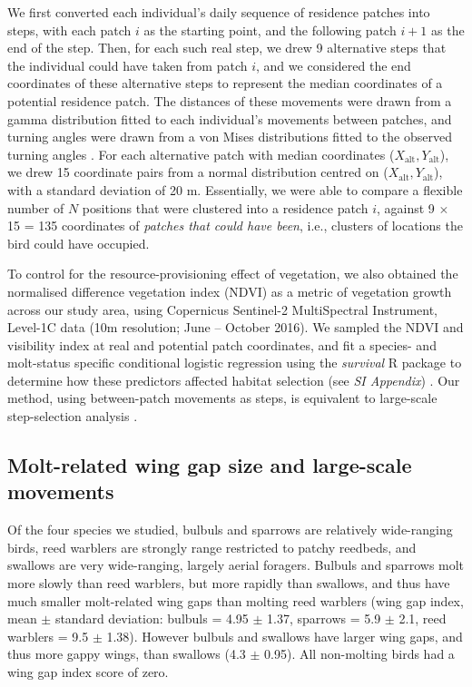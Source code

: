 \begin{refsection}
We first converted each individual's daily sequence of residence patches into steps, with each patch $i$ as the starting point, and the following patch $i+1$ as the end of the step.
Then, for each such real step, we drew 9 alternative steps that the individual could have taken from patch $i$, and we considered the end coordinates of these alternative steps to represent the median coordinates of a potential residence patch.
The distances of these movements were drawn from a gamma distribution fitted to each individual's movements between patches, and turning angles were drawn from a von Mises distributions fitted to the observed turning angles \citep{signer2019}.
For each alternative patch with median coordinates ($X_\text{alt}, Y_\text{alt}$), we drew 15 coordinate pairs from a normal distribution centred on ($X_\text{alt}, Y_\text{alt}$), with a standard deviation of 20 m.
Essentially, we were able to compare a flexible number of $N$ positions that were clustered into a residence patch $i$, against 9 $ \times$ 15 = 135 coordinates of \textit{patches that could have been}, i.e., clusters of locations the bird could have occupied.

To control for the resource-provisioning effect of vegetation, we also obtained the normalised difference vegetation index (NDVI) as a metric of vegetation growth \citep{pettorelli2011} across our study area, using Copernicus Sentinel-2 MultiSpectral Instrument, Level-1C data (10m resolution; June -- October 2016).
We sampled the NDVI and visibility index at real and potential patch coordinates, and fit a species- and molt-status specific conditional logistic regression using the \textit{survival} R package to determine how these predictors affected habitat selection (see \textit{SI Appendix}) \cite{signer2019,fieberg2021}.
Our method, using between-patch movements as steps, is equivalent to large-scale step-selection analysis \citep{fieberg2021}.

\subsection*{Molt-related wing gap size and large-scale movements}

Of the four species we studied, bulbuls and sparrows are relatively wide-ranging birds, reed warblers are strongly range restricted to patchy reedbeds, and swallows are very wide-ranging, largely aerial foragers.
Bulbuls and sparrows molt more slowly than reed warblers, but more rapidly than swallows, and thus have much smaller molt-related wing gaps than molting reed warblers {(wing gap index, mean $\pm$ standard deviation: bulbuls = 4.95 $\pm$ 1.37, sparrows = 5.9 $\pm$ 2.1, reed warblers = 9.5 $\pm$ 1.38)}.
However bulbuls and swallows have larger wing gaps, and thus more gappy wings, than swallows (4.3 $\pm$ 0.95).
All non-molting birds had a wing gap index score of zero.


\end{refsection}
